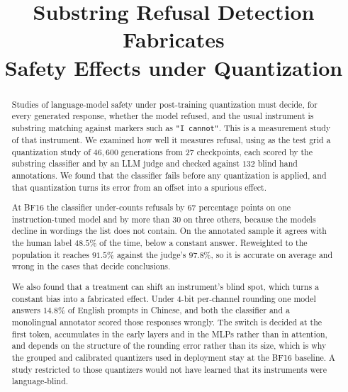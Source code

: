 \documentclass[conference,compsoc,letterpaper]{IEEEtran}
\begin{document}
\title{Substring Refusal Detection Fabricates\\ Safety Effects under Quantization}

\author{%
\and
{}
}

\maketitle

\begin{abstract}
Studies of language-model safety under post-training quantization must decide,
for every generated response, whether the model refused, and the usual
instrument is substring matching against markers such as \texttt{"I cannot"}.
This is a measurement study of that instrument. We examined how well it measures refusal, using as the test grid a quantization study of $46{,}600$ generations from $27$ checkpoints, each scored by
the substring classifier and by an LLM judge and checked against $132$ blind
hand annotations. We found that the classifier fails before any quantization
is applied, and that quantization turns its error from an offset into a
spurious effect.

At BF16 the classifier under-counts refusals by $67$ percentage points on one
instruction-tuned model and by more than $30$ on three others, because the
models decline in wordings the list does not contain. On the annotated sample
it agrees with the human label $48.5\%$ of the time, below a constant answer. Reweighted to the population it reaches $91.5\%$ against the judge's $97.8\%$,
so it is accurate on average and wrong in the cases that decide conclusions.

We also found that a treatment can shift an instrument's blind spot, which
turns a constant bias into a fabricated effect. Under 4-bit per-channel
rounding one model answers $14.8\%$ of English prompts in Chinese, and both
the classifier and a monolingual annotator scored those responses wrongly. The
switch is decided at the first token, accumulates in the early layers and in
the MLPs rather than in attention, and depends on the structure of the rounding
error rather than its size, which is why the grouped and calibrated quantizers
used in deployment stay at the BF16 baseline. A study restricted to those
quantizers would not have learned that its instruments were language-blind.
\end{abstract}
\end{document}

